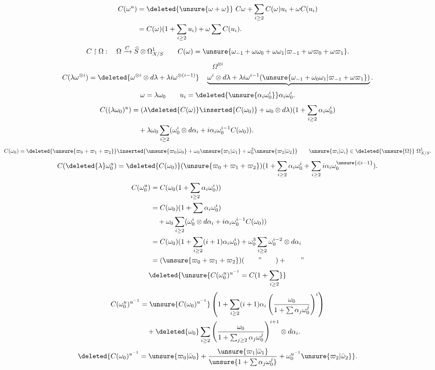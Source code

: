 \[
\begin{aligned}
C(\omega^u)&=\deleted{\unsure{\omega+\omega}}\ C\omega+\sum_{i\geq2}C(\omega)u_i+\omega C(u_i)\\
&=C(\omega)(1+\sum_{i\geq2}u_i)+\omega\sum C(u_i).
\end{aligned}
\]
\[
C\upharpoonright\Omega:\quad\Omega\xrightarrow{C}\widehat S\otimes\Omega^1_{X/S}
\qquad C(\omega)=\unsure{\omega_{-1}+\omega\omega_0+\omega\omega_1|\varpi_{-1}+\omega\varpi_0+\omega\varpi_1}.
\]
\[\Omega^{\otimes i}\]
\[
C(\lambda\omega^{\otimes i})=
\deleted{\omega^{\otimes i}\otimes d\lambda+\lambda i\omega^{\otimes(i-1)}}
\quad\underbrace{\omega^i\otimes d\lambda+\lambda i\omega^{i-1}(\unsure{\omega_{-1}+\omega_0\omega_1|\varpi_{-1}+\omega\varpi_1})}.
\]
\[\omega=\lambda\omega_0\qquad u_i=\deleted{\unsure{\alpha_i\omega_0^i}}\alpha_i\omega_0^i.\]
\[
\begin{aligned}
C((\lambda\omega_0)^u)&=(\lambda\deleted{C(\omega)}\inserted{C(\omega_0)}+\omega_0\otimes d\lambda)(1+\sum_{i\geq2}\alpha_i\omega_0^i)\\
&\quad+\lambda\omega_0\sum_{i\geq2}(\omega_0^i\otimes d\alpha_i+i\alpha_i\omega_0^{i-1}C(\omega_0)).
\end{aligned}
\]
\[
C(\omega_0)=\deleted{\unsure{\varpi_0+\varpi_1+\varpi_2}}
\inserted{\unsure{\varpi_0|\bar\omega_0}+\omega_0\unsure{\varpi_1|\bar\omega_1}+\omega_0^2\unsure{\varpi_2|\bar\omega_2}}
\qquad\unsure{\varpi_i|\bar\omega_i}\in\deleted{\unsure{\Omega}}\ \Omega^1_{X/S}.
\]
\[
C(\deleted{\lambda}\omega_0^u)=\deleted{C(\omega_0)}(\unsure{\varpi_0+\varpi_1+\varpi_2})(1+\sum_{i\geq2}\alpha_i\omega_0^i+\sum_{i\geq2}i\alpha_i\omega_0^{\unsure{i|i-1}}).
\]
\[
\begin{aligned}
C(\omega_0^u)&=C(\omega_0(1+\sum_{i\geq2}\alpha_i\omega_0^i))\\
&=C(\omega_0)(1+\sum\alpha_i\omega_0^i)\\
&\quad+\omega_0\sum_{i\geq2}(\omega_0^i\otimes d\alpha_i+i\alpha_i\omega_0^{i-1}C(\omega_0))\\
&=C(\omega_0)(1+\sum_{i\geq2}(i+1)\alpha_i\omega_0^i)+\omega_0^3\sum_{i\geq2}\omega_0^{i-2}\otimes d\alpha_i\\
&=(\unsure{\varpi_0+\varpi_1+\varpi_2})(\qquad\text{''}\qquad)+\qquad\text{''}
\end{aligned}
\]
\[\deleted{\unsure{C(\omega_0^u)^{u^{-1}}=C(1+\sum_{i\geq2}}}\]
\[
\begin{aligned}
C(\omega_0^u)^{u^{-1}}&=\unsure{C(\omega_0)^{u^{-1}}}
\left(1+\sum_{i\geq2}(i+1)\alpha_i\left(\frac{\omega_0}{1+\sum\alpha_j\omega_0^j}\right)^i\right)\\
&\quad+\deleted{\omega_0}\sum_{i\geq2}\left(\frac{\omega_0}{1+\sum_{j\geq2}\alpha_j\omega_0^j}\right)^{i+1}\otimes d\alpha_i.
\end{aligned}
\]
\[
\deleted{C(\omega_0)^{u^{-1}}=\unsure{\varpi_0|\bar\omega_0}+\frac{\unsure{\varpi_1|\bar\omega_1}}{\unsure{1+\sum\alpha_j\omega_0^j}}+\omega_0^{u^{-1}}\unsure{\varpi_2|\bar\omega_2}}.
\]
